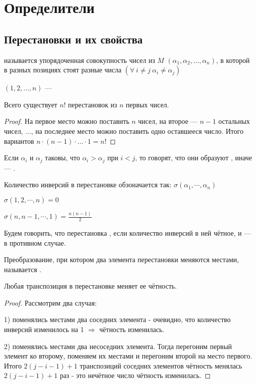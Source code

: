 \chapter{Определители}
\section{Перестановки и их свойства}
\begin{opred}
 называется упорядоченная совокупность чисел из $M$ $(\alpha_1,\alpha_2,\ldots,\alpha_n)$, в которой в разных позициях стоят разные числа $(\forall\ i\neq{}j\ \alpha_i\neq{}\alpha_j)$

$(1,2,\ldots,n)$ --- 
\end{opred}
\begin{theor}
Всего существует $n!$ перестановок из $n$ первых чисел.
\end{theor}
\begin{proof}
На первое место можно поставить $n$ чисел, на второе --- $n-1$ остальных чисел, $\ldots$, на последнее место можно поставить одно оставшееся число. Итого вариантов $n\cdot(n-1)\cdot\ldots\cdot1=n!$
\end{proof}
\begin{opred}
Если $\alpha_i$ и $\alpha_j$ таковы, что $\alpha_i>\alpha_j$ при $i<j$, то говорят, что они образуют , иначе --- .

Количество инверсий в перестановке обзоначается так: $\sigma(\alpha_1,\cdots,\alpha_n)$

$\sigma(1,2,\cdots,n)=0$

$\sigma(n,n-1,\cdots,1)=\frac{n(n-1)}2$
\end{opred}
\begin{opred}
Будем говорить, что перестановка , если количество инверсий в ней чётное, и \newline{} --- в противном случае.
\end{opred}
\begin{opred}
Преобразование, при котором два элемента перестановки меняются местами, называется .
\end{opred}
\begin{theor}
Любая транспозиция в перестановке меняет ее чётность.
\end{theor}
\begin{proof}
Рассмотрим два случая:

1) поменялись местами два соседних элемента - очевидно, что количество инверсий изменилось на 1 $\Rightarrow$ чётность изменилась.

2) поменялись местами два несоседних элемента. Тогда перегоним первый элемент ко второму, поменяем их местами и перегоним второй на место первого. Итого $2(j-i-1)+1$ транспозиций соседних элементов \then чётность менялась $2(j-i-1)+1$ раз - это нечётное число \then чётность изменилась.
\end{proof}
